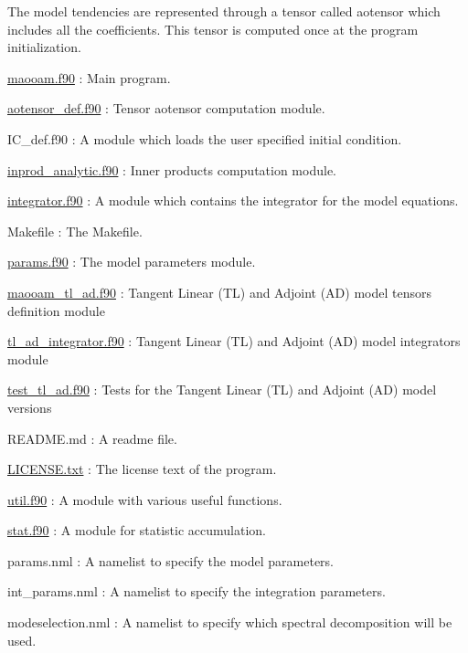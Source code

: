 The model tendencies are represented through a tensor called aotensor which includes all the coefficients. This tensor is computed once at the program initialization.


\begin{DoxyItemize}
\item \hyperlink{maooam_8f90}{maooam.\-f90} \-: Main program.
\item \hyperlink{aotensor__def_8f90}{aotensor\-\_\-def.\-f90} \-: Tensor aotensor computation module.
\item I\-C\-\_\-def.\-f90 \-: A module which loads the user specified initial condition.
\item \hyperlink{inprod__analytic_8f90}{inprod\-\_\-analytic.\-f90} \-: Inner products computation module.
\item \hyperlink{integrator_8f90}{integrator.\-f90} \-: A module which contains the integrator for the model equations.
\item Makefile \-: The Makefile.
\item \hyperlink{params_8f90}{params.\-f90} \-: The model parameters module.
\item \hyperlink{maooam__tl__ad_8f90}{maooam\-\_\-tl\-\_\-ad.\-f90} \-: Tangent Linear (T\-L) and Adjoint (A\-D) model tensors definition module
\item \hyperlink{tl__ad__integrator_8f90}{tl\-\_\-ad\-\_\-integrator.\-f90} \-: Tangent Linear (T\-L) and Adjoint (A\-D) model integrators module
\item \hyperlink{test__tl__ad_8f90}{test\-\_\-tl\-\_\-ad.\-f90} \-: Tests for the Tangent Linear (T\-L) and Adjoint (A\-D) model versions
\item R\-E\-A\-D\-M\-E.\-md \-: A readme file.
\item \hyperlink{LICENSE_8txt}{L\-I\-C\-E\-N\-S\-E.\-txt} \-: The license text of the program.
\item \hyperlink{util_8f90}{util.\-f90} \-: A module with various useful functions.
\item \hyperlink{stat_8f90}{stat.\-f90} \-: A module for statistic accumulation.
\item params.\-nml \-: A namelist to specify the model parameters.
\item int\-\_\-params.\-nml \-: A namelist to specify the integration parameters.
\item modeselection.\-nml \-: A namelist to specify which spectral decomposition will be used.
\end{DoxyItemize}


